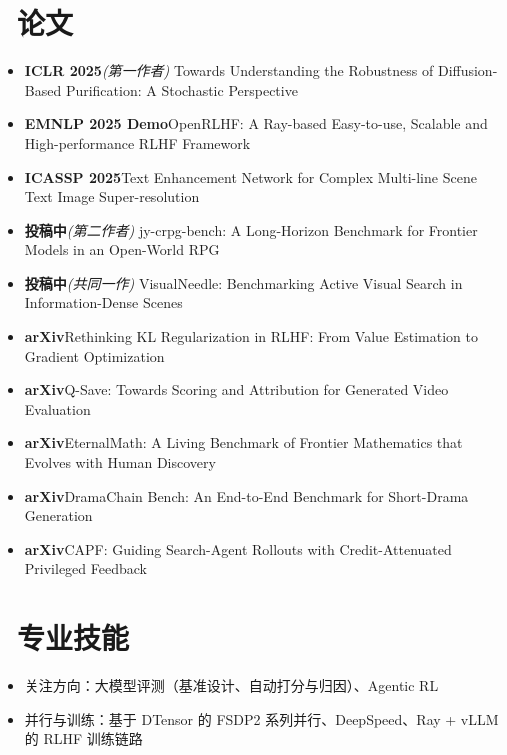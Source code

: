 \documentclass{resume}
\begin{document}
\section{\faPrint\ 论文}
{\small
\begin{itemize}
  \item \textbf{ICLR 2025}\quad \textit{(第一作者)} Towards Understanding the Robustness of Diffusion-Based Purification: A Stochastic Perspective
  \item \textbf{EMNLP 2025 Demo}\quad OpenRLHF: A Ray-based Easy-to-use, Scalable and High-performance RLHF Framework
  \item \textbf{ICASSP 2025}\quad Text Enhancement Network for Complex Multi-line Scene Text Image Super-resolution
  \item \textbf{投稿中}\quad \textit{(第二作者)} jy-crpg-bench: A Long-Horizon Benchmark for Frontier Models in an Open-World RPG
  \item \textbf{投稿中}\quad \textit{(共同一作)} VisualNeedle: Benchmarking Active Visual Search in Information-Dense Scenes
  \item \textbf{arXiv}\quad Rethinking KL Regularization in RLHF: From Value Estimation to Gradient Optimization
  \item \textbf{arXiv}\quad Q-Save: Towards Scoring and Attribution for Generated Video Evaluation
  \item \textbf{arXiv}\quad EternalMath: A Living Benchmark of Frontier Mathematics that Evolves with Human Discovery
  \item \textbf{arXiv}\quad DramaChain Bench: An End-to-End Benchmark for Short-Drama Generation
  \item \textbf{arXiv}\quad CAPF: Guiding Search-Agent Rollouts with Credit-Attenuated Privileged Feedback
\end{itemize}
\par}

\section{\faCogs\ 专业技能}
\begin{itemize}
  \item 关注方向：大模型评测（基准设计、自动打分与归因）、Agentic RL
  \item 并行与训练：基于 DTensor 的 FSDP2 系列并行、DeepSpeed、Ray + vLLM 的 RLHF 训练链路
\end{itemize}
\end{document}
